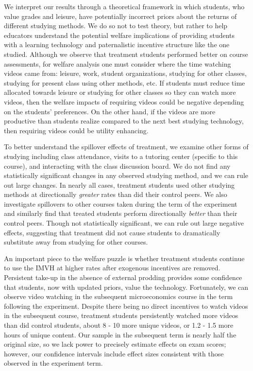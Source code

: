\documentclass[12pt]{article}
\begin{document}
We interpret our results through a theoretical framework in which students, who value grades and leisure, have potentially incorrect priors about the returns of different studying methods. We do so not to test theory, but rather to help educators understand the potential welfare implications of providing students with a learning technology and paternalistic incentive structure like the one studied. Although we observe that treatment students performed better on course assessments, for welfare analysis one must consider where the time watching videos came from: leisure, work, student organizations, studying for other classes, studying for present class using other methods, etc. If students must reduce time allocated towards leisure or studying for other classes so they can watch more videos, then the welfare impacts of requiring videos could be negative depending on the students' preferences. On the other hand, if the videos are more productive than students realize compared to the next best studying technology, then requiring videos could be utility enhancing.

To better understand the spillover effects of treatment, we examine other forms of studying including class attendance, visits to a tutoring center (specific to this course), and interacting with the class discussion board. We do not find any statistically significant changes in any observed studying method, and we can rule out large changes. In nearly all cases, treatment students used other studying methods at directionally \textit{greater} rates than did their control peers. We also investigate spillovers to other courses taken during the term of the experiment and similarly find that treated students perform directionally \textit{better} than their control peers. Though not statistically significant, we can rule out large negative effects, suggesting that treatment did not cause students to dramatically substitute away from studying for other courses.

An important piece to the welfare puzzle is whether treatment students continue to use the IMVH at higher rates after exogenous incentives are removed. Persistent take-up in the absence of external prodding provides some confidence that students, now with updated priors, value the technology. Fortunately, we can observe video watching in the subsequent microeconomics course in the term following the experiment. Despite there being no direct incentives to watch videos in the subsequent course, treatment students persistently watched more videos than did control students, about 8 - 10 more unique videos, or 1.2 - 1.5 more hours of unique content. Our sample in the subsequent term is nearly half the original size, so we lack power to precisely estimate effects on exam scores; however, our confidence intervals include effect sizes consistent with those observed in the experiment term.
\end{document}

